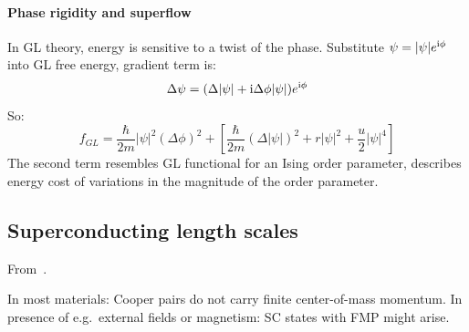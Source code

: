 \documentclass[../notes.tex]{subfiles}
\begin{document}
\paragraph{Phase rigidity and superflow}

In GL theory, energy is sensitive to a twist of the phase.
Substitute \(\psi = \vert \psi \vert e^{\mathrm{i} \phi}\) into GL free energy, gradient term is:
\begin{equation}
	\Delta \psi = (\Delta \vert \psi \vert + \mathrm{i} \Delta \phi \vert \psi \vert) e^{\mathrm{i} \phi}
\end{equation}
So:
\begin{equation}
	f_{GL}  = \frac{\hbar}{2m} \vert \psi \vert^2 (\Delta \phi)^2 + \left[ \frac{\hbar}{2m} (\Delta \vert \psi \vert)^2 + r \vert \psi \vert^2 + \frac{u}{2} \vert \psi \vert^4 \right]
\end{equation}
The second term resembles GL functional for an Ising order parameter, describes energy cost of variations in the magnitude of the order parameter.



\subsection{Superconducting length scales}

From~\cite{wittBypassingLatticeBCSBEC2024}.


In most materials: Cooper pairs do not carry finite center-of-mass momentum.
In presence of e.g.\ external fields or magnetism: SC states with FMP might arise.
\end{document}
